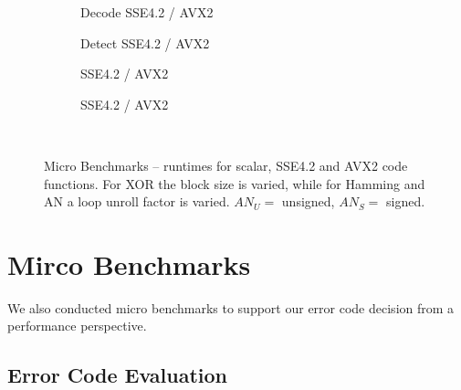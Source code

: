 \begin{figure*}[t!]
\begin{subfigure}[t]{1.3in}
		\label{fig:codingbenchmark:hardening:vec}
	\end{subfigure}
	\hfill
	\begin{subfigure}[t]{1.3in}
		
		\setcounter{subfigure}{3}
		\vspace{-3mm}
		\caption{Decode SSE4.2 / AVX2}
		\label{fig:codingbenchmark:decode:vec}%
	\end{subfigure}
	\hfill
	\begin{subfigure}[t]{1.3in}
		
		\setcounter{subfigure}{5}
		\vspace{-3mm}
		\caption{Detect SSE4.2 / AVX2}
		\label{fig:codingbenchmark:check:vec}%
	\end{subfigure}
	\hfill
	\begin{subfigure}[t]{1.3in}
		
		\setcounter{subfigure}{7}
		\vspace{-3mm}
		\caption{SSE4.2 / AVX2}
		\label{fig:refinements:decode:vec:zoom}
	\end{subfigure}
	\hfill
	\begin{subfigure}[t]{1.3in}
		
		\setcounter{subfigure}{9}
		\vspace{-3mm}
		\caption{SSE4.2 / AVX2}
		\label{fig:refinements:check:vec:zoom}
	\end{subfigure}
	\hfill\null
	\\
	\null\hfill
	
	\hfill\null
	\vspace{-4mm}
	\caption{Micro Benchmarks -- runtimes for scalar, SSE4.2 and AVX2 code functions. For XOR the block size is varied, while for Hamming and AN a loop unroll factor is varied. \(AN_U=\) unsigned, \(AN_S=\) signed.}%
	\label{fig:codingbenchmark:encode}%
	\vspace{-3mm}
\end{figure*}

\section{Mirco Benchmarks}
\label{sec:MicroBenchmarks}

We also conducted micro benchmarks to support our error code decision from a performance perspective. 

\subsection{Error Code Evaluation}

